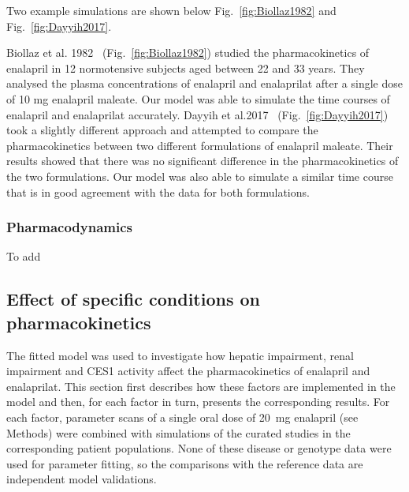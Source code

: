 \documentclass[pharmaceutics,article,submit,pdftex,moreauthors]{Definitions/mdpi}
\begin{document}
Two example simulations are shown below Fig.~\ref{fig:Biollaz1982} and Fig.~\ref{fig:Dayyih2017}.



Biollaz et al. 1982~\cite{Biollaz1982} (Fig.~\ref{fig:Biollaz1982}) studied the pharmacokinetics of enalapril in 12 normotensive subjects aged between 22 and 33 years. They analysed the plasma concentrations of enalapril and enalaprilat after a single dose of 10 mg enalapril maleate. Our model was able to simulate the time courses of enalapril and enalaprilat accurately. Dayyih et al.2017~\cite{Dayyih2017} (Fig.~\ref{fig:Dayyih2017}) took a slightly different approach and attempted to compare the pharmacokinetics between two different formulations of enalapril maleate. Their results showed that there was no significant difference in the pharmacokinetics of the two formulations. Our model was also able to simulate a similar time course that is in good agreement with the data for both formulations.

\subsubsection{Pharmacodynamics}
\label{sec:results_pd_simulations}
To add

\subsection{Effect of specific conditions on pharmacokinetics}
\label{sec:results_conditions}
The fitted model was used to investigate how hepatic impairment, renal impairment and CES1 activity affect the pharmacokinetics of enalapril and enalaprilat. This section first describes how these factors are implemented in the model and then, for each factor in turn, presents the corresponding results. For each factor, parameter scans of a single oral dose of 20~mg enalapril (see Methods) were combined with simulations of the curated studies in the corresponding patient populations. None of these disease or genotype data were used for parameter fitting, so the comparisons with the reference data are independent model validations.
\end{document}
